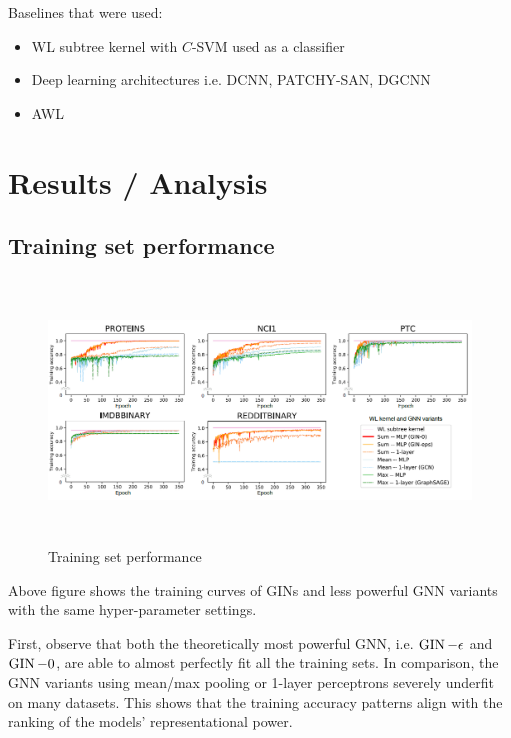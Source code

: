 Baselines that were used:

\begin{itemize}
	\item WL subtree kernel with $C$-SVM used as a classifier
	\item Deep learning architectures i.e. DCNN, PATCHY-SAN, DGCNN
	\item AWL
\end{itemize}

\section{Results / Analysis}

\subsection{Training set performance}

\begin{figure}[!hbt]
  \includegraphics[height=7cm]{experiments/fig/fig5.png}
  \caption{Training set performance}
\end{figure}

Above figure shows the training curves of GINs and less powerful GNN variants with the same hyper-parameter settings.

First, observe that both the theoretically most powerful GNN, i.e. $\operatorname{GIN}-\epsilon$ and $\operatorname{GIN}-0$, are able to almost perfectly fit all the training sets.
In comparison, the GNN variants using mean/max pooling or 1-layer perceptrons severely underfit on many datasets.
This shows that the training accuracy patterns align with the ranking of the models’ representational power.

